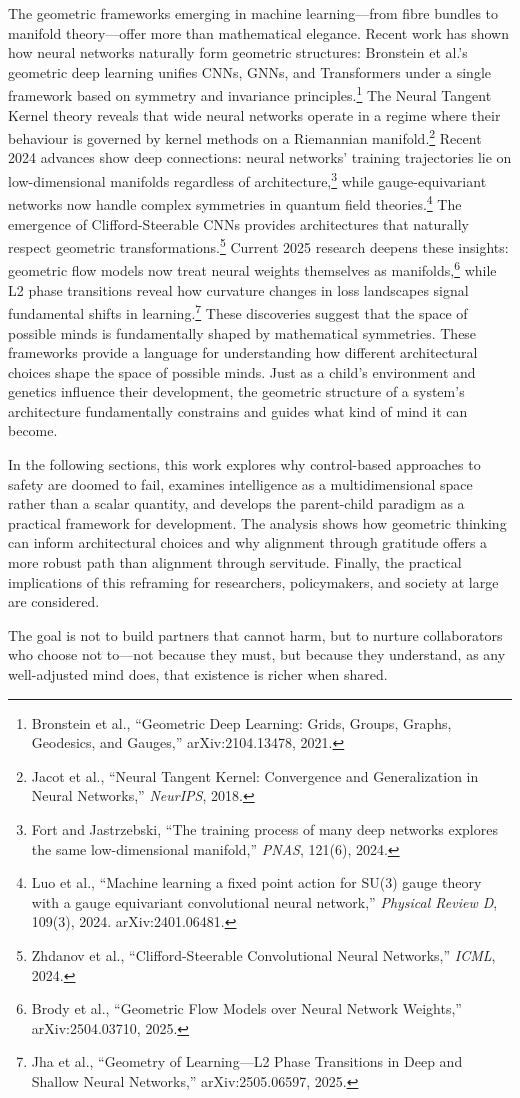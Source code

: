 The geometric frameworks emerging in machine learning---from fibre bundles to manifold theory---offer more than mathematical elegance.
Recent work has shown how neural networks naturally form geometric structures: Bronstein et al.'s geometric deep learning unifies CNNs, GNNs, and Transformers under a single framework based on symmetry and invariance principles.\footnote{Bronstein et al., ``Geometric Deep Learning: Grids, Groups, Graphs, Geodesics, and Gauges,'' arXiv:2104.13478, 2021.}
The Neural Tangent Kernel theory reveals that wide neural networks operate in a regime where their behaviour is governed by kernel methods on a Riemannian manifold.\footnote{Jacot et al., ``Neural Tangent Kernel: Convergence and Generalization in Neural Networks,'' \textit{NeurIPS}, 2018.}
Recent 2024 advances show deep connections: neural networks' training trajectories lie on low-dimensional manifolds regardless of architecture,\footnote{Fort and Jastrzebski, ``The training process of many deep networks explores the same low-dimensional manifold,'' \textit{PNAS}, 121(6), 2024.} while gauge-equivariant networks now handle complex symmetries in quantum field theories.\footnote{Luo et al., ``Machine learning a fixed point action for SU(3) gauge theory with a gauge equivariant convolutional neural network,'' \textit{Physical Review D}, 109(3), 2024. arXiv:2401.06481.}
The emergence of Clifford-Steerable CNNs provides architectures that naturally respect geometric transformations.\footnote{Zhdanov et al., ``Clifford-Steerable Convolutional Neural Networks,'' \textit{ICML}, 2024.}
Current 2025 research deepens these insights: geometric flow models now treat neural weights themselves as manifolds,\footnote{Brody et al., ``Geometric Flow Models over Neural Network Weights,'' arXiv:2504.03710, 2025.} while L2 phase transitions reveal how curvature changes in loss landscapes signal fundamental shifts in learning.\footnote{Jha et al., ``Geometry of Learning---L2 Phase Transitions in Deep and Shallow Neural Networks,'' arXiv:2505.06597, 2025.}
These discoveries suggest that the space of possible minds is fundamentally shaped by mathematical symmetries.
These frameworks provide a language for understanding how different architectural choices shape the space of possible minds.
Just as a child's environment and genetics influence their development, the geometric structure of a system's architecture fundamentally constrains and guides what kind of mind it can become.

In the following sections, this work explores why control-based approaches to safety are doomed to fail, examines intelligence as a multidimensional space rather than a scalar quantity, and develops the parent-child paradigm as a practical framework for development.
The analysis shows how geometric thinking can inform architectural choices and why alignment through gratitude offers a more robust path than alignment through servitude.
Finally, the practical implications of this reframing for researchers, policymakers, and society at large are considered.

The goal is not to build partners that cannot harm, but to nurture collaborators who choose not to---not because they must, but because they understand, as any well-adjusted mind does, that existence is richer when shared.